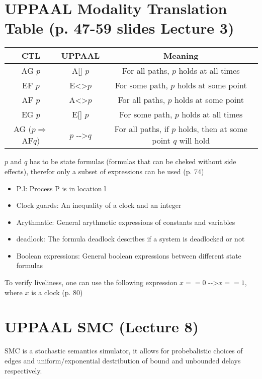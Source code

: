 \documentclass{article}
\begin{document}
	\section{UPPAAL Modality Translation Table (p. 47-59 slides Lecture 3)}
		\begin{table}[H]
			\begin{tabular}{c|c|c}
				CTL&UPPAAL&Meaning\\
				\hline
				AG $p$&A[] $p$&For all paths, $p$ holds at all times\\
				EF $p$&E\textless\textgreater $p$&For some path, $p$ holds at some point\\
				AF $p$&A\textless\textgreater $p$&For all paths, $p$ holds at some point\\
				EG $p$&E[] $p$&For some path, $p$ holds at all times\\
				AG $(p\Rightarrow$ AF$q)$&$p$ -{}-\textgreater$q$&For all paths, if $p$ holds, then at some point $q$ will hold
			\end{tabular}
		\end{table}
		$p$ and $q$ has to be state formulas (formulas that can be cheked without side effects), therefor only a subset of expressions can be used (p. 74)
		\begin{itemize}
			\item P$.$l: Process P is in location l
			\item Clock guards: An inequality of a clock and an integer
			\item Arythmatic: General arythmetic expressions of constants and variables
			\item deadlock: The formula deadlock describes if a system is deadlocked or not
			\item Boolean expressions: General boolean expressions between different state formulas
		\end{itemize}
		To verify liveliness, one can use the following expression $x==0$ -{}-\textgreater$x==1$, where $x$ is a clock (p. 80)
	
	\section{UPPAAL SMC (Lecture 8)}
		SMC is a stochastic semantics simulator, it allows for probebalistic choices of edges and uniform/exponential destribution of bound and unbounded delays respectively.
\end{document}
